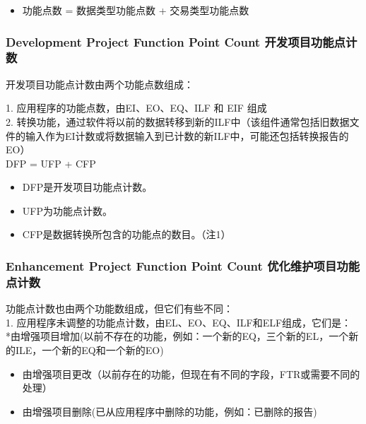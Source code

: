 \documentclass{book}        %
\providecommand{\tightlist}{%
  \setlength{\itemsep}{0pt}\setlength{\parskip}{0pt}}
\begin{document}
\begin{itemize}
\tightlist
\item
  功能点数 = 数据类型功能点数 + 交易类型功能点数
\end{itemize}

\hypertarget{development-project-function-point-count-ux5f00ux53d1ux9879ux76eeux529fux80fdux70b9ux8ba1ux6570}{%
\subsubsection{Development Project Function Point Count
开发项目功能点计数}\label{development-project-function-point-count-ux5f00ux53d1ux9879ux76eeux529fux80fdux70b9ux8ba1ux6570}}

开发项目功能点计数由两个功能点数组成：

1. 应用程序的功能点数，由EI、EO、EQ、ILF 和 EIF 组成\\
2.
转换功能，通过软件将以前的数据转移到新的ILF中（该组件通常包括旧数据文件的输入作为EI计数或将数据输入到已计数的新ILF中，可能还包括转换报告的EO）\\

DFP = UFP + CFP

\begin{itemize}
\tightlist
\item
  DFP是开发项目功能点计数。
\item
  UFP为功能点计数。
\item
  CFP是数据转换所包含的功能点的数目。（注1）
\end{itemize}

\hypertarget{enhancement-project-function-point-count-ux4f18ux5316ux7ef4ux62a4ux9879ux76eeux529fux80fdux70b9ux8ba1ux6570}{%
\subsubsection{Enhancement Project Function Point Count
优化维护项目功能点计数}\label{enhancement-project-function-point-count-ux4f18ux5316ux7ef4ux62a4ux9879ux76eeux529fux80fdux70b9ux8ba1ux6570}}

功能点计数也由两个功能数组成，但它们有些不同：\\
1. 应用程序未调整的功能点计数，由EL、EO、EQ、ILF和ELF组成，它们是：\\
*由增强项目增加(以前不存在的功能，例如：一个新的EQ，三个新的EL，一个新的ILE，一个新的EQ和一个新的EO)

\begin{itemize}
\tightlist
\item
  由增强项目更改（以前存在的功能，但现在有不同的字段，FTR或需要不同的处理）
\item
  由增强项目删除(已从应用程序中删除的功能，例如：已删除的报告)
\end{itemize}
\end{document}
